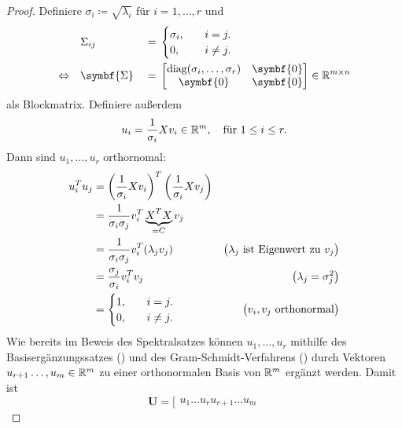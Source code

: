 \begin{proof}
    \noindent Definiere \(\sigma_i \coloneq \sqrt{\lambda_i}\) für \(i = 1,\ldots,r\) und
    \begin{alignat*}{2}
        &\Sigma_{ij} &{}={}& 
            \begin{cases}
                \sigma_i, \quad &i=j. \\
                0, \quad &i \neq j.
            \end{cases} \\
        \Lra \quad &\symbf{\Sigma} &{}={}&  
        \begin{bmatrix}
            \text{diag}(\sigma_i,\ldots,\sigma_r) & \symbf{0} \\
            \symbf{0} & \symbf{0}
        \end{bmatrix}
        \in \R^{m \times n}
    \end{alignat*}
    als Blockmatrix.
    Definiere außerdem
    \begin{equation*}
        u_i = \frac{1}{\sigma_i}Xv_i \in \mathbb{R}^{m}, \quad \text{für } 1 \leq i \leq r.
    \end{equation*}
    Dann sind \(u_1,\ldots,u_r\) orthornomal:
    \begin{align*}
        u_i^{T}u_j &= {\left(\frac{1}{\sigma_i}Xv_i\right)}^{T}\left(\frac{1}{\sigma_i}Xv_j\right) \\
        &= \frac{1}{\sigma_i \sigma_j}v_i^{T}\underbrace{X^{\raisebox{0.2ex}{\(\scriptstyle{T}\)}}X}_{=C}v_j \\
        &= \frac{1}{\sigma_i\sigma_j}v_i^{T}(\lambda_j v_j) & \bigl(\lambda_j \text{ ist Eigenwert zu } v_j \bigr) \\
        &= \frac{\sigma_j}{\sigma_i}v_i^{T}v_j & \bigl(\lambda_j = \sigma_j^{2}\bigr) \\
        &=
        \begin{cases}
            1, \quad & i=j. \\
            0, \quad & i \neq j.
        \end{cases} & \bigl(v_i,v_j \text{ orthonormal}\bigr)
    \end{align*}
    Wie bereits im Beweis des Spektralsatzes können \(u_1,\ldots,u_r\) mithilfe des Basisergänzungssatzes () und des Gram-Schmidt-Verfahrens () durch Vektoren \(u_{r+1}\ldots,u_m \in \mathbb{R}^{m}\) zu einer orthonormalen Basis von \(\mathbb{R}^{m}\) ergänzt werden.
    Damit ist 
    \begin{equation*}
        \symbf{U} =
        \big[
        \begin{matrix}
            u_1 \dots u_{r}u_{r+1} \dots u_m

\end{matrix}
\end{equation*}
\end{proof}
